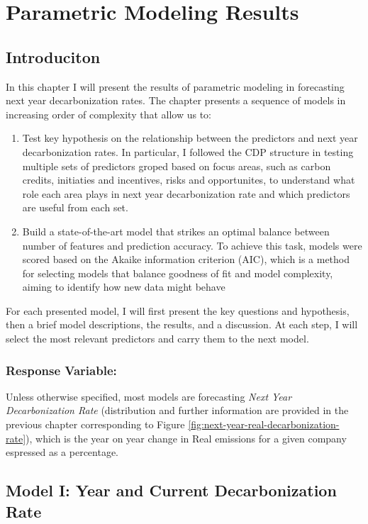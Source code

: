 \chapter{Parametric Modeling Results}

\section{Introduciton}
In this chapter I will present the results of parametric modeling in forecasting next year decarbonization rates. The chapter presents a sequence of models in increasing order of complexity that allow us to:
\begin{enumerate}
    \item Test key hypothesis on the relationship between the predictors and next year decarbonization rates. In particular, I followed the CDP structure in testing multiple sets of predictors groped based on focus areas, such as carbon credits, initiaties and incentives, risks and opportunites, to understand what role each area plays in next year decarbonization rate and which predictors are useful from each set. 
    \item Build a state-of-the-art model that strikes an optimal balance between number of features and prediction accuracy. To achieve this task, models were scored based on the Akaike information criterion (AIC), which is a method for selecting models that balance goodness of fit and model complexity, aiming to identify how new data might behave \cite{AIC}
\end{enumerate}
For each presented model, I will first present the key questions and hypothesis, then a brief model descriptions, the results, and a discussion. At each step, I will select the most relevant predictors and carry them to the next model. 

\subsection{Response Variable:}
\noindent Unless otherwise specified, most models are forecasting \textit{Next Year Decarbonization Rate} (distribution and further information are provided in the previous chapter corresponding to Figure \ref{fig:next-year-real-decarbonization-rate}), which is the year on year change in Real emissions for a given company espressed as a percentage. 

\section{Model I: Year and Current Decarbonization Rate}

